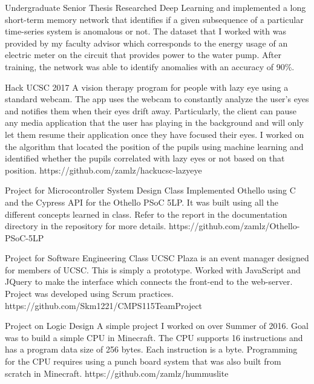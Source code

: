 \documentclass{cv}
\begin{document}
\begin{adjustwidth}{0.5cm}{0.5cm}
{Undergraduate Senior Thesis}
{Researched Deep Learning and implemented a long short-term memory
network that identifies if a given subsequence of a particular
time-series system is anomalous or not. The dataset that I worked with
was provided by my faculty advisor which corresponds to the energy usage
of an electric meter on the circuit that provides power to the water
pump. After training, the network was able to identify anomalies with
an accuracy of 90\%.}{}

{Hack UCSC 2017}
{A vision therapy program for people with lazy eye using a standard
webcam. The app uses the webcam to constantly analyze the user's eyes
and notifies them when their eyes drift away. Particularly, the client
can pause any media application that the user has playing in the
background and will only let them resume their application once they
have focused their eyes. I worked on the algorithm that located the
position of the pupils using machine learning and identified whether
the pupils correlated with lazy eyes or not based on that position.}
{https://github.com/zamlz/hackucsc-lazyeye}

{Project for Microcontroller System Design Class}
{Implemented Othello using C and the Cypress API for the Othello PSoC 5LP.
It was built using all the different concepts learned in class. Refer to the
report in the documentation directory in the repository for more details.}
{https://github.com/zamlz/Othello-PSoC-5LP}

{Project for Software Engineering Class}
{UCSC Plaza is an event manager designed for members of UCSC. This is simply
a prototype. Worked with JavaScript and JQuery to make the interface which
connects the front-end to the web-server. Project was developed using Scrum
practices.}
{https://github.com/Skm1221/CMPS115TeamProject}

{Project on Logic Design}
{A simple project I worked on over Summer of 2016. Goal was to build a simple
CPU in Minecraft. The CPU supports 16 instructions and has a program data
size of 256 bytes. Each instruction is a byte. Programming for the CPU
requires using a punch board system that was also built from scratch in
Minecraft.}
{https://github.com/zamlz/hummuslite}
\end{adjustwidth}

\end{document}
